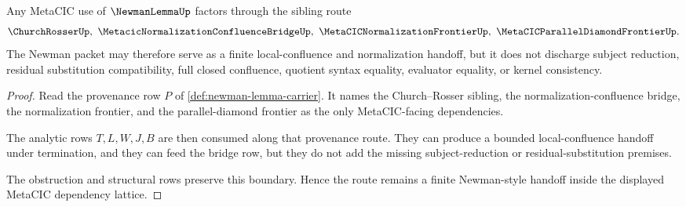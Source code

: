 \begin{theorem}
\label{thm:newman-lemma-metacic-route}
Any MetaCIC use of $\NewmanLemmaUp$ factors through the sibling route
$$
\ChurchRosserUp,\ \MetacicNormalizationConfluenceBridgeUp,\ \MetaCICNormalizationFrontierUp,\ \MetaCICParallelDiamondFrontierUp .
$$
The Newman packet may therefore serve as a finite local-confluence and normalization handoff, but it does not discharge subject reduction, residual substitution compatibility, full closed confluence, quotient syntax equality, evaluator equality, or kernel consistency.
\end{theorem}
\begin{proof}
Read the provenance row $P$ of \autoref{def:newman-lemma-carrier}. It names the Church--Rosser sibling, the normalization-confluence bridge, the normalization frontier, and the parallel-diamond frontier as the only MetaCIC-facing dependencies.

The analytic rows $T,L,W,J,B$ are then consumed along that provenance route. They can produce a bounded local-confluence handoff under termination, and they can feed the bridge row, but they do not add the missing subject-reduction or residual-substitution premises.

The obstruction and structural rows preserve this boundary. Hence the route remains a finite Newman-style handoff inside the displayed MetaCIC dependency lattice.
\end{proof}


\begin{closurestatus}{\NewmanLemmaUp}
  \theoryclosure{\seedClosure}
  \formalstatus{\unformalizedV}
\end{closurestatus}

